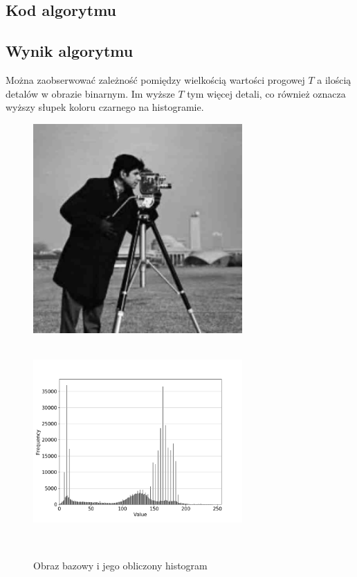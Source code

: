 \documentclass[a4paper,12pt]{book}
\begin{document}
\subsection*{Kod algorytmu}

\subsection*{Wynik algorytmu}
Można zaobserwować zależność pomiędzy wielkością wartości progowej $T$ a ilością detalów w obrazie binarnym. Im wyższe $T$ tym więcej detali, co również oznacza wyższy słupek koloru czarnego na histogramie. 
\begin{figure}[H]
	\caption{Obraz bazowy i jego obliczony histogram}
	\includegraphics[width=8cm, height=8cm]{man-unmodified.jpg}
	\includegraphics[width=8cm, height=8cm]{5-1/calculate-photoman.png}
	

\end{figure}
\end{document}
